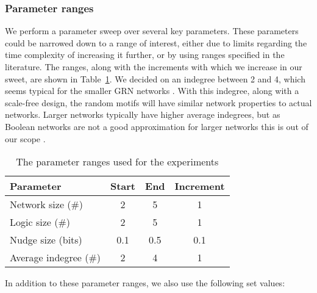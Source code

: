 \documentclass[../main.tex]{subfiles}
\begin{document}
\subsubsection{Parameter ranges}

We perform a parameter sweep over several key parameters.
These parameters could be narrowed down to a range of interest, either due to limits regarding the time complexity of increasing it further, or by using ranges specified in the literature.
The ranges, along with the increments with which we increase in our sweet, are shown in Table~\ref{parameters}.
We decided on an indegree between 2 and 4, which seems typical for the smaller GRN networks \cite{lahdesmaki2003learning}.
With this indegree, along with a scale-free design, the random motifs will have similar network properties to actual networks.
Larger networks typically have higher average indegrees, but as Boolean networks are not a good approximation for larger networks this is out of our scope \cite{lahdesmaki2003learning, karlebach2008modelling}.

\begin{center}
\begin{table}
\label{parameters}
\caption{The parameter ranges used for the experiments}
\begin{tabular}{| l | c | c | c |}
\hline
Parameter & Start & End & Increment \\
\hline
Network size (\#) & 2 & 5 & 1 \\
Logic size (\#) & 2 & 5 & 1 \\
Nudge size (bits) & 0.1 & 0.5 & 0.1 \\
Average indegree (\#) & 2 & 4 & 1 \\
\hline
\end{tabular}
\end{table}
\end{center}

In addition to these parameter ranges, we also use the following set values:

\end{document}
